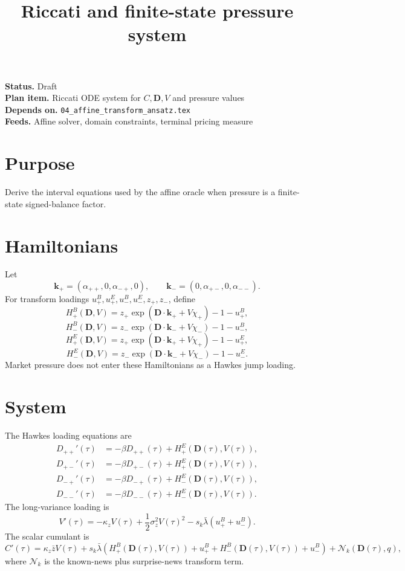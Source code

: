 \documentclass[11pt]{article}
\title{Riccati and finite-state pressure system}
\author{}
\date{}
\begin{document}
\maketitle

\noindent\textbf{Status.} Draft\\
\textbf{Plan item.} Riccati ODE system for \(C,\mathbf D,V\) and pressure values\\
\textbf{Depends on.} \texttt{04\_affine\_transform\_ansatz.tex}\\
\textbf{Feeds.} Affine solver, domain constraints, terminal pricing measure

\section{Purpose}

Derive the interval equations used by the affine oracle when pressure is a
finite-state signed-balance factor.

\section{Hamiltonians}

Let
\[
    \mathbf k_+=(\alpha_{++},0,\alpha_{-+},0),
    \qquad
    \mathbf k_-=(0,\alpha_{+-},0,\alpha_{--}).
\]
For transform loadings \(u_+^B,u_+^E,u_-^B,u_-^E,z_+,z_-\), define
\[
    H_+^B(\mathbf D,V)
    =
    z_+\exp(\mathbf D\cdot\mathbf k_+ + V\chi_+)-1-u_+^B,
\]
\[
    H_-^B(\mathbf D,V)
    =
    z_-\exp(\mathbf D\cdot\mathbf k_- + V\chi_-)-1-u_-^B,
\]
\[
    H_+^E(\mathbf D,V)
    =
    z_+\exp(\mathbf D\cdot\mathbf k_+ + V\chi_+)-1-u_+^E,
\]
\[
    H_-^E(\mathbf D,V)
    =
    z_-\exp(\mathbf D\cdot\mathbf k_- + V\chi_-)-1-u_-^E.
\]
Market pressure does not enter these Hamiltonians as a Hawkes jump loading.

\section{System}

The Hawkes loading equations are
\[
\begin{aligned}
    D_{++}'(\tau) &= -\beta D_{++}(\tau) + H_+^E(\mathbf D(\tau),V(\tau)),\\
    D_{+-}'(\tau) &= -\beta D_{+-}(\tau) + H_+^E(\mathbf D(\tau),V(\tau)),\\
    D_{-+}'(\tau) &= -\beta D_{-+}(\tau) + H_-^E(\mathbf D(\tau),V(\tau)),\\
    D_{--}'(\tau) &= -\beta D_{--}(\tau) + H_-^E(\mathbf D(\tau),V(\tau)).
\end{aligned}
\]
The long-variance loading is
\[
    V'(\tau)
    =
    -\kappa_zV(\tau)
    +\frac{1}{2}\sigma_z^2V(\tau)^2
    -s_k\bar\lambda(u_+^B+u_-^B).
\]
The scalar cumulant is
\[
    C'(\tau)
    =
    \kappa_z\bar zV(\tau)
    +s_k\bar\lambda
    \left(
        H_+^B(\mathbf D(\tau),V(\tau))+u_+^B
        +H_-^B(\mathbf D(\tau),V(\tau))+u_-^B
    \right)
    +\mathcal N_k(\mathbf D(\tau),q),
\]
where \(\mathcal N_k\) is the known-news plus surprise-news transform term.
\end{document}
